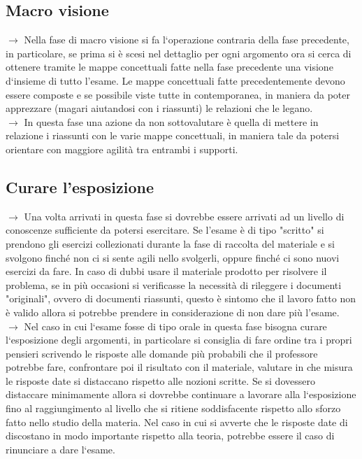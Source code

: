 \documentclass[11pt,a4paper]{article}
\begin{document}
\subsection{Macro visione}
$\rightarrow$ Nella fase di macro visione si fa l`operazione contraria della fase precedente, in particolare, se prima si è scesi nel dettaglio per ogni argomento ora si cerca di ottenere tramite le mappe concettuali fatte nella fase precedente una visione d`insieme di tutto l'esame. Le mappe concettuali fatte precedentemente devono essere composte e se possibile viste tutte in contemporanea, in maniera da poter apprezzare (magari aiutandosi con i riassunti) le relazioni che le legano.\\
$\rightarrow$ In questa fase una azione da non sottovalutare è quella di mettere in relazione i riassunti con le varie mappe concettuali, in maniera tale da potersi orientare con maggiore agilità tra entrambi i supporti.\\

\subsection{Curare l'esposizione}
$\rightarrow$ Una volta arrivati in questa fase si dovrebbe essere arrivati ad un livello di conoscenze sufficiente da potersi esercitare. Se l'esame è di tipo "scritto" si prendono gli esercizi collezionati durante la fase di raccolta del materiale e si svolgono finché non ci si sente agili nello svolgerli, oppure finché ci sono nuovi esercizi da fare. In caso di dubbi usare il materiale prodotto per risolvere il problema, se in più occasioni si verificasse la necessità di rileggere i documenti "originali", ovvero di documenti riassunti, questo è sintomo che il lavoro fatto non è valido allora si potrebbe prendere in considerazione di non dare più l'esame.\\
$\rightarrow$ Nel caso in cui l`esame fosse di tipo orale in questa fase bisogna curare l`esposizione degli argomenti, in particolare si consiglia di fare ordine tra i propri pensieri scrivendo le risposte alle domande più probabili che il professore potrebbe fare, confrontare poi il risultato con il materiale, valutare in che misura le risposte date si distaccano rispetto alle nozioni scritte. Se si dovessero distaccare minimamente allora si dovrebbe continuare a lavorare alla l`esposizione fino al raggiungimento al livello che si ritiene soddisfacente rispetto allo sforzo fatto nello studio della materia. Nel caso in cui si avverte che le risposte date di discostano in modo importante rispetto alla teoria, potrebbe essere il caso di rinunciare a dare l`esame.\\
\end{document}
